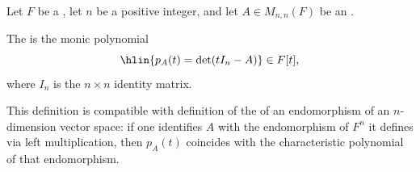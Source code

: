 \begin{definition} \label{definition:characteristic_polynomial_of_a_square_matrix_over_a_field}
Let $F$ be a , let $n$ be a positive integer, and let $A \in M_{n,n}(F)$ be an .

The  is the monic polynomial
$$\hlin{p_A(t) = \det(tI_n - A)} \in F[t],$$
where $I_n$ is the $n \times n$ identity matrix.

This definition is compatible with definition of the  of an endomorphism of an $n$-dimension vector space: if one identifies $A$ with the endomorphism of $F^n$ it defines via left multiplication, then $p_A(t)$ coincides with the characteristic polynomial of that endomorphism.
\end{definition}
